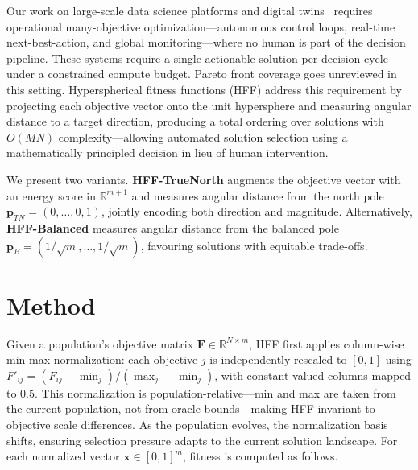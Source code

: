 \documentclass[sigconf]{acmart}
\begin{document}
Our work on large-scale data science platforms and digital twins~\cite{morgan2017mastering} requires operational many-objective optimization---autonomous control loops, real-time next-best-action, and global monitoring---where no human is part of the decision pipeline. These systems require a single actionable solution per decision cycle under a constrained compute budget. Pareto front coverage goes unreviewed in this setting. Hyperspherical fitness functions (HFF) address this requirement by projecting each objective vector onto the unit hypersphere and measuring angular distance to a target direction, producing a total ordering over solutions with $O(MN)$ complexity---allowing automated solution selection using a mathematically principled decision in lieu of human intervention.

We present two variants. \textbf{HFF-TrueNorth} augments the objective vector with an energy score in $\mathbb{R}^{m+1}$ and measures angular distance from the north pole $\mathbf{p}_{TN} = (0, \ldots, 0, 1)$, jointly encoding both direction and magnitude. Alternatively, \textbf{HFF-Balanced} measures angular distance from the balanced pole $\mathbf{p}_B = (1/\sqrt{m}, \ldots, 1/\sqrt{m})$, favouring solutions with equitable trade-offs.


\section{Method}
\label{sec:method}

Given a population's objective matrix $\mathbf{F} \in \mathbb{R}^{N \times m}$, HFF first applies column-wise min-max normalization: each objective $j$ is independently rescaled to $[0,1]$ using $F'_{ij} = (F_{ij} - \min_j) / (\max_j - \min_j)$, with constant-valued columns mapped to $0.5$. This normalization is population-relative---min and max are taken from the current population, not from oracle bounds---making HFF invariant to objective scale differences. As the population evolves, the normalization basis shifts, ensuring selection pressure adapts to the current solution landscape. For each normalized vector $\mathbf{x} \in [0,1]^m$, fitness is computed as follows.
\end{document}
